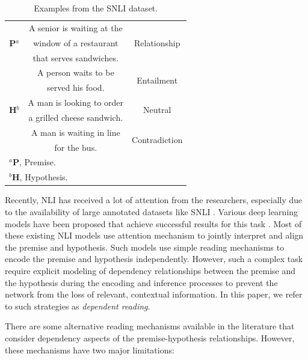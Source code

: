 \documentclass[11pt,a4paper]{article}
\begin{document}
	
	\begin{table}[t]
		\small
		\begin{center}
			\begin{tabular}{|c|c|c|}
				\hline 
				\multirow{3}{*}{\textbf{P$^a$}} & A senior is waiting at the & \multirow{3}{*}{Relationship} \\
				& window of a restaurant &  \\
				& that serves sandwiches. &  \\ \hline
				\multirow{6}{*}{\textbf{H$^b$}} & A person waits to be   & \multirow{2}{*}{Entailment} \\
				& served his food. &  \\ \cline{2-3}
				& A man is looking to order & \multirow{2}{*}{Neutral} \\ 
				& a grilled cheese sandwich. & \\ \cline{2-3}
				& A man is waiting in line & \multirow{2}{*}{Contradiction} \\
				& for the bus. &  \\ \hline
				\multicolumn{3}{|l|}{$^a$\textbf{P}, Premise.}\\
				\multicolumn{3}{|l|}{$^b$\textbf{H}, Hypothesis.}\\ \hline
			\end{tabular}
		\end{center}
		\caption{\label{tab:sample} Examples from the SNLI dataset.}
	\end{table}
	
	
	Recently, NLI has received a lot of attention from the researchers, especially due to the availability of large annotated datasets like SNLI \cite{snli}. Various deep learning models have been proposed that achieve successful results for this task \cite{gong2017,ibm2017,him2017,nse2017,google2016, kai_2016,re-read}. Most of these existing NLI models use attention mechanism to jointly interpret and align the premise and hypothesis. Such models use simple reading mechanisms to encode the premise and hypothesis independently. However, such a complex task require explicit modeling of dependency relationships between the premise and the hypothesis during the encoding and inference processes to prevent the network from the loss of relevant, contextual information. In this paper, we refer to such strategies as \emph{dependent reading}. 
	
	There are some alternative reading mechanisms available in the literature \cite{re-read,Rocktaschel2015} that consider dependency aspects of the premise-hypothesis relationships. However, these mechanisms have two major limitations:
	
\end{document}
